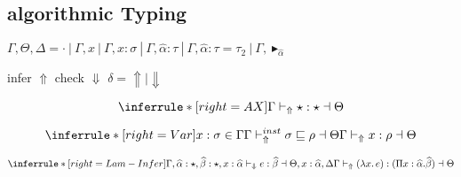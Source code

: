 \newcommand{\tpmapsto}[3]{#2\mapsto#3}
\newcommand{\castupe}{\ensuremath{\mathsf{cast}^{\uparrow}\ }}
\newcommand{\castdowne}{\ensuremath{\mathsf{cast}^{\downarrow}\ }}
\newcommand{\judge}{\Gamma\vdash}
\newcommand{\forallvars}[1]{\forall \overbar{#1}}
\newcommand{\olpolymorphic}[2]{\vdash^{ol} #1 \sqsubseteq #2}

\gram{\otte\ottinterrule}

\gram{\ottR\ottinterrule}

\gram{\ottt\ottinterrule}

\subsection{algorithmic Typing}

\newcommand{\checktype}{\Gamma\vdash_\Downarrow}
\newcommand{\infertype}{\Gamma\vdash_\Uparrow}
\newcommand{\infercheck}{\Gamma\vdash_\delta}

\newcommand{\checktypeno}{\vdash_\Downarrow}
\newcommand{\infertypeno}{\vdash_\Uparrow}
\newcommand{\infercheckno}{\vdash_\delta}

\newcommand{\instinfer}{\vdash^{inst}_\Uparrow}
\newcommand{\instcheck}{\vdash^{inst}_\Downarrow}
\newcommand{\instinfercheck}{\vdash^{inst}_\delta}

\newcommand{\polyinfer}{\Gamma\vdash^{poly}_\Uparrow}
\newcommand{\polycheck}{\Gamma\vdash^{poly}_\Downarrow}
\newcommand{\polycheckno}{\vdash^{poly}_\Downarrow}
\newcommand{\polyinfercheck}{\vdash^{poly}_\delta}

\newcommand{\dsk}{\vdash^{dsk}}
\newcommand{\unify}{\vdash^{unify}}

\newcommand{\genvar}{\widehat}
\newcommand{\genA}{\genvar{\alpha}}
\newcommand{\genB}{\genvar{\beta}}


$\Gamma, \Theta, \Delta  = \cdot~|~\Gamma, x~|~\Gamma, x:\sigma~|~\Gamma, \genA:\tau~|~\Gamma, \genA:\tau = \tau_2~|~\Gamma, \blacktriangleright_{\genA}$

\framebox{$ \infercheck e : \rho \dashv \Theta $ } infer $\Uparrow$ check $\Downarrow$ $\delta = \Uparrow \mid \Downarrow$

\[
\inferrule*[right=AX]
{ }
{\infertype \star : \star \dashv \Theta}
\]

\[
\inferrule*[right=Var]
{x:\sigma \in \Gamma \\ \Gamma \instinfer \sigma \sqsubseteq \rho \dashv \Theta }
{\infertype x : \rho \dashv \Theta}
\]

\[
\inferrule*[right=Lam-Infer]
{\Gamma, \genA:\star, \genB:\star, x: \genA \checktypeno e : \genB \dashv \Theta, x:\genA , \Delta}
{\infertype (\lambda x.\, e) : (\Pi x: \genA. \genB) \dashv \Theta}
\]

